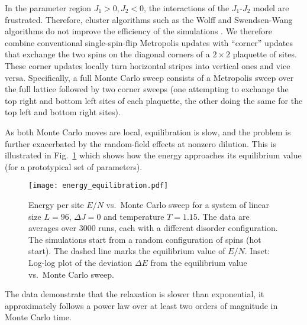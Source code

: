 \documentclass[twocolumn,showpacs,superscriptaddress,aps,prb]{revtex4-2}
\begin{document}
In the parameter region $J_1 > 0, J_2 < 0$, the interactions of the $J_1$-$J_2$ model are
frustrated. Therefore, cluster algorithms such as the Wolff \cite{Wolff89} and
Swendsen-Wang \cite{SwendsenWang87} algorithms
do not improve the efficiency of the simulations \cite{KalzHoneckerFuchsPruschke08}.
We therefore combine conventional single-spin-flip Metropolis updates \cite{MRRT53}
with ``corner'' updates that exchange the two spins on the diagonal corners of a
$2\times 2$ plaquette of sites. These corner updates locally turn horizontal stripes
into vertical ones and vice versa. Specifically, a full Monte Carlo sweep consists
of a Metropolis sweep over the full lattice followed by two corner sweeps (one attempting to
exchange the top right and bottom left sites of each plaquette, the other doing the same
for the top left and bottom right sites).

As both Monte Carlo moves are local, equilibration is slow, and the problem is further
exacerbated by the random-field effects at nonzero dilution. This is illustrated in Fig.\
\ref{fig:energy_equilibration} which shows how the energy approaches its equilibrium value
(for a prototypical set of parameters).
\begin{figure}
\texttt{[image: energy\_equilibration.pdf]}
\caption{Energy per site $E/N$ vs.\ Monte Carlo sweep for a system of linear size $L=96$,
$\Delta J =0$ and temperature $T=1.15$. The data are averages over 3000 runs, each with a
different disorder configuration. The simulations start from a random configuration of spins
(hot start). The dashed line marks the equilibrium value of $E/N$.
Inset: Log-log plot of the deviation $\Delta E$ from the equilibrium value vs.\ Monte Carlo
sweep.}
\label{fig:energy_equilibration}
\end{figure}
The data demonstrate that the relaxation is slower than exponential, it approximately follows a
power law over at least two orders of magnitude in Monte Carlo time.
\end{document}
